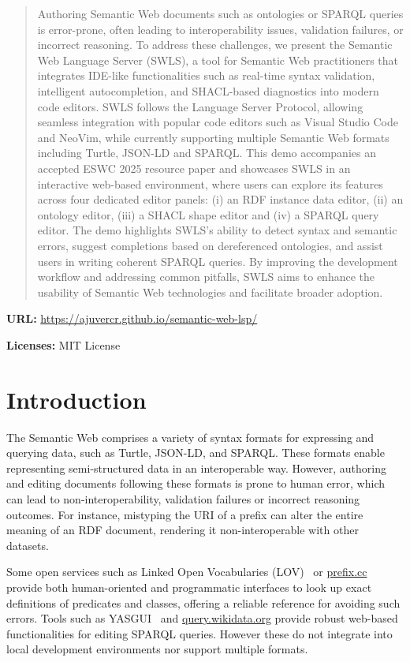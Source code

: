 
\begin{abstract}
  Authoring Semantic Web documents such as ontologies or SPARQL queries is error-prone, often leading to interoperability issues, validation failures, or incorrect reasoning.
  To address these challenges, we present the Semantic Web Language Server (SWLS), a tool for Semantic Web practitioners that integrates IDE-like functionalities such as real-time syntax validation, intelligent autocompletion, and SHACL-based diagnostics into modern code editors.
  SWLS follows the Language Server Protocol, allowing seamless integration with popular code editors such as Visual Studio Code and NeoVim, while currently supporting multiple Semantic Web formats including Turtle, JSON-LD and SPARQL.
  This demo accompanies an accepted ESWC 2025 resource paper and showcases SWLS in an interactive web-based environment, where users can explore its features across four dedicated editor panels: (i) an RDF instance data editor, (ii) an ontology editor, (iii) a SHACL shape editor and (iv) a SPARQL query editor. 
  The demo highlights SWLS’s ability to detect syntax and semantic errors, suggest completions based on dereferenced ontologies, and assist users in writing coherent SPARQL queries.
  By improving the development workflow and addressing common pitfalls, SWLS aims to enhance the usability of Semantic Web technologies and facilitate broader adoption.
\end{abstract}

\textbf{URL:} \url{https://ajuvercr.github.io/semantic-web-lsp/} 

\textbf{Licenses:} MIT License


\section{Introduction}%
\label{sec:introduction}

The Semantic Web comprises a variety of syntax formats for expressing and querying data, such as Turtle, JSON-LD, and SPARQL. 
These formats enable representing semi-structured data in an interoperable way.
However, authoring and editing documents following these formats is prone to human error, which can lead to non-interoperability, validation failures or incorrect reasoning outcomes.
For instance, mistyping the URI of a prefix can alter the entire meaning of an RDF document, rendering it non-interoperable with other datasets. 

Some open services such as Linked Open Vocabularies (LOV)~\cite{LOV2017} or \href{https://prefix.cc}{prefix.cc} provide both human-oriented and programmatic interfaces to look up exact definitions of predicates and classes, offering a reliable reference for avoiding such errors.
Tools such as YASGUI~\cite{yasgui,10.1007/978-3-642-41242-4_7} and \href{https://query.wikidata.org/}{query.wikidata.org} provide robust web-based functionalities for editing SPARQL queries.
However these do not integrate into local development environments nor support multiple formats.

